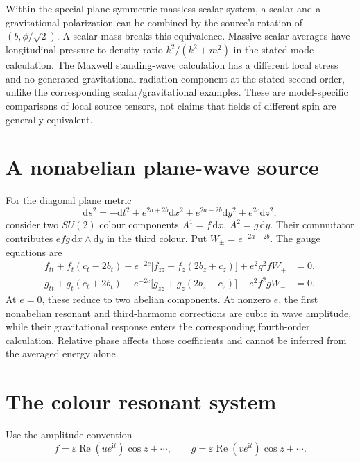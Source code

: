 \documentclass[11pt,a4paper,oneside]{book}
\theoremstyle{plain}
\theoremstyle{definition}
\theoremstyle{remark}
\newcommand{\dd}{\mathrm d}
\newcommand{\ii}{\mathrm i}
\newcommand{\src}[2]{\cite{#1}}
\begin{document}
Within the special plane-symmetric massless scalar system, a scalar and a gravitational polarization can be combined by the source's rotation of $(b,\phi/\sqrt2)$. A scalar mass breaks this equivalence. Massive scalar averages have longitudinal pressure-to-density ratio $k^2/(k^2+m^2)$ in the stated mode calculation. The Maxwell standing-wave calculation has a different local stress and no generated gravitational-radiation component at the stated second order, unlike the corresponding scalar/gravitational examples. These are model-specific comparisons of local source tensors, not claims that fields of different spin are generally equivalent. \src{R19}{thm:v19v97-rotation,thm:v19v98-mode,thm:v19v99-wave}

\section{A nonabelian plane-wave source}
For the diagonal plane metric
\begin{equation}
 \dd s^2=-\dd t^2+e^{2a+2b}\dd x^2
 +e^{2a-2b}\dd y^2+e^{2c}\dd z^2,
 \label{eq:plane-metric}
\end{equation}
consider two $SU(2)$ colour components $A^1=f\,\dd x$, $A^2=g\,\dd y$. Their commutator contributes $efg\,\dd x\wedge\dd y$ in the third colour. Put $W_\pm=e^{-2a\pm2b}$. The gauge equations are
\begin{align}
 f_{tt}+f_t(c_t-2b_t)
 -e^{-2c}\bigl[f_{zz}-f_z(2b_z+c_z)\bigr]
 +e^2g^2fW_+&=0,\label{eq:two-colour-f}\\
 g_{tt}+g_t(c_t+2b_t)
 -e^{-2c}\bigl[g_{zz}+g_z(2b_z-c_z)\bigr]
 +e^2f^2gW_-&=0.\label{eq:two-colour-g}
\end{align}
At $e=0$, these reduce to two abelian components. At nonzero $e$, the first nonabelian resonant and third-harmonic corrections are cubic in wave amplitude, while their gravitational response enters the corresponding fourth-order calculation. Relative phase affects those coefficients and cannot be inferred from the averaged energy alone. \cite{R20}

\section{The colour resonant system}
Use the amplitude convention
\begin{equation}
 f=\varepsilon\operatorname{Re}(u e^{\ii t})\cos z+\cdots,
 \qquad g=\varepsilon\operatorname{Re}(v e^{\ii t})\cos z+\cdots.
\end{equation}
\end{document}

